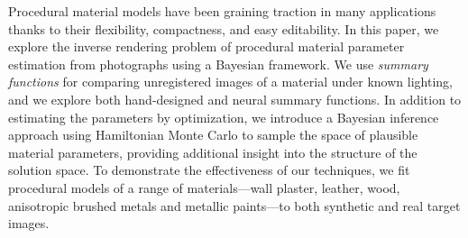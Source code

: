 Procedural material models have been graining traction in many applications thanks to their flexibility, compactness, and easy editability.
In this paper, we explore the inverse rendering problem of procedural material parameter estimation from photographs using a Bayesian framework.
We use \emph{summary functions} for comparing unregistered images of a material under known lighting, and we explore both hand-designed and neural summary functions. In addition to estimating the parameters by optimization, we introduce a Bayesian inference approach using Hamiltonian Monte Carlo to sample the space of plausible material parameters, providing additional insight into the structure of the solution space.
To demonstrate the effectiveness of our techniques, we fit procedural models of a range of materials---wall plaster, leather, wood, anisotropic brushed metals and metallic paints---to both synthetic and real target images.

